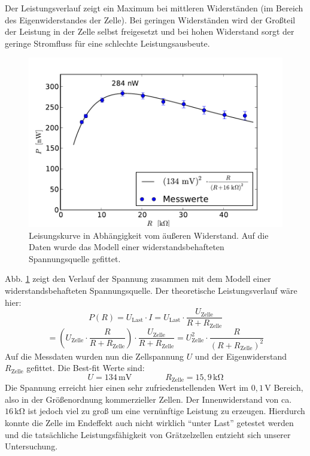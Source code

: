 \documentclass[11pt]{scrartcl}
\newcommand{\unit}[1]{\ensuremath{\,\mathrm{#1}}} %
\begin{document}
Der Leistungsverlauf zeigt ein Maximum bei mittleren Widerständen (im Bereich des Eigenwiderstandes der Zelle). Bei geringen Widerständen wird der Großteil der Leistung in der Zelle selbst freigesetzt und bei hohen Widerstand sorgt der geringe Stromfluss für eine schlechte Leistungsausbeute.
\begin{figure}[ht]
\begin{center}
\includegraphics[width=1.0\textwidth]{images/graetzel_leistung.pdf}
\end{center}
\vspace{-1.5\baselineskip}
\caption{Leisungskurve in Abhängigkeit vom äußeren Widerstand. Auf die Daten wurde das Modell einer widerstandsbehafteten Spannungsquelle gefittet.}
\label{leistungskurve}
\end{figure}
Abb. \ref{leistungskurve} zeigt den Verlauf der Spannung zusammen mit dem Modell einer widerstandsbehafteten Spannungsquelle. Der theoretische Leistungsverlauf wäre hier:
\[
P(R)= U_{\text{Last}}\cdot I
= U_{\text{Last}}\cdot \frac{U_{\text{Zelle}}}{R+R_{\text{Zelle}}}
\]
\[
= \left(U_{\text{Zelle}}\cdot \frac{R}{R+R_{\text{Zelle}}}\right)\cdot \frac{U_{\text{Zelle}}}{R+R_{\text{Zelle}}}
= U_{\text{Zelle}}^2\cdot \frac{R}{(R+R_{\text{Zelle}})^2}
\]
Auf die Messdaten wurden nun die Zellspannung $U$ und der Eigenwiderstand $R_{\text{Zelle}}$ gefittet. Die Best-fit Werte sind:
\[
U = 134\unit{mV}
\qquad\qquad
R_{\text{Zelle}} = 15,9\unit{k\Omega}
\]
Die Spannung erreicht hier einen sehr zufriedenstellenden Wert im $0,1\unit{V}$ Bereich, also in der Größenordnung kommerzieller Zellen. Der Innenwiderstand von ca. $16\unit{k\Omega}$ ist jedoch viel zu groß um eine vernünftige Leistung zu erzeugen. Hierdurch konnte die Zelle im Endeffekt auch nicht wirklich "`unter Last"' getestet werden und die tatsächliche Leistungsfähigkeit von Grätzelzellen entzieht sich unserer Untersuchung.
\end{document}
